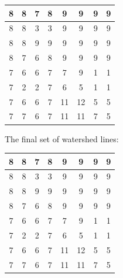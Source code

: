 \documentclass[fleqn]{article}
\begin{document}
\begin{description}
    \begin{tabular}{| c | c | c | c | c | c | c | c |}
        \hline
        8 & 8 & \cellcolor{red}7 & 8 & 9 & 9 & 9 & 9 \\ \hline
        8 & 8 & \cellcolor{red} 3 & \cellcolor{red} 3 & 9 & 9 & 9 & 9 \\ \hline
        8 & 8 & 9 & 9 & 9 & 9 & 9 & 9 \\ \hline
        8 & \cellcolor{blue}7 & \cellcolor{blue} 6 & 8 & 9 & 9 & 9 & 9 \\ \hline
        \cellcolor{blue}7 & \cellcolor{blue} 6 & \cellcolor{blue} 6 & \cellcolor{lightgray} 7 & \cellcolor{green} 7 & 9 & \cellcolor{green} 1 & \cellcolor{green} 1 \\ \hline
        \cellcolor{blue}7 & \cellcolor{blue} 2 & \cellcolor{blue} 2 & \cellcolor{lightgray} 7 & \cellcolor{green} 6 & \cellcolor{green} 5 & \cellcolor{green} 1 & \cellcolor{green} 1 \\ \hline
        \cellcolor{blue}7 & \cellcolor{blue} 6 & \cellcolor{blue} 6 & \cellcolor{lightgray} 7 & 11 & 12 & \cellcolor{green} 5 & \cellcolor{green} 5 \\ \hline
        \cellcolor{blue}7 & \cellcolor{blue}7 & \cellcolor{blue} 6 & \cellcolor{blue}7 & 11 & 11 & \cellcolor{green} 7 & \cellcolor{green} 5 \\
        \hline
    \end{tabular}

    The final set of watershed lines:

    \begin{tabular}{| c | c | c | c | c | c | c | c |}
        \hline
        8 & 8 & 7 & 8 & 9 & 9 & 9 & 9 \\ \hline
        8 & 8 & 3 & 3 & 9 & 9 & 9 & 9 \\ \hline
        \cellcolor{lightgray} 8 & \cellcolor{lightgray} 8 & \cellcolor{lightgray} 9 & \cellcolor{lightgray} 9 & 9 & 9 & 9 & 9 \\ \hline
        \cellcolor{lightgray} 8 & 7 & 6 & \cellcolor{lightgray} 8 & \cellcolor{lightgray} 9 & \cellcolor{lightgray} 9 & \cellcolor{lightgray} 9 & \cellcolor{lightgray} 9 \\ \hline
        7 & 6 & 6 & \cellcolor{lightgray} 7 & 7 & 9 & 1 & 1 \\ \hline
        7 & 2 & 2 & \cellcolor{lightgray} 7 & 6 & 5 & 1 & 1 \\ \hline
        7 & 6 & 6 & \cellcolor{lightgray} 7 & \cellcolor{lightgray} 11 & 12 & 5 & 5 \\ \hline
        7 & 7 & 6 & 7 & \cellcolor{lightgray} 11 & 11 & 7 & 5 \\
        \hline
    \end{tabular}


\end{description}
\end{document}
